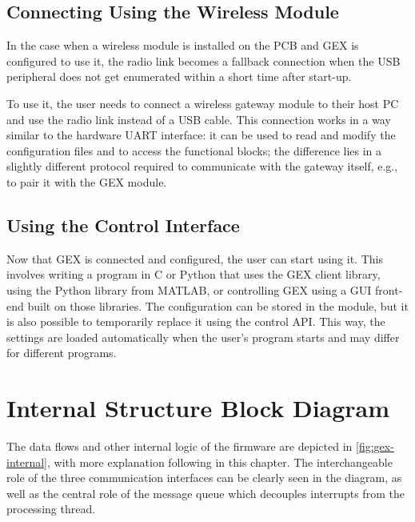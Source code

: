 \subsection{Connecting Using the Wireless Module}

In the case when a wireless module is installed on the \gls{PCB} and GEX is configured to use it, the radio link becomes a fallback connection when the \gls{USB} peripheral does not get enumerated within a short time after start-up.

To use it, the user needs to connect a wireless gateway module to their host \gls{PC} and use the radio link instead of a \gls{USB} cable. This connection works in a way similar to the hardware UART interface: it can be used to read and modify the configuration files and to access the functional blocks; the difference lies in a slightly different protocol required to communicate with the gateway itself, e.g., to pair it with the GEX module.

\subsection{Using the Control Interface}

Now that GEX is connected and configured, the user can start using it. This involves writing a program in C or Python that uses the GEX client library, using the Python library from MATLAB, or controlling GEX using a \gls{GUI} front-end built on those libraries. The configuration can be stored in the module, but it is also possible to temporarily replace it using the control \gls{API}. This way, the settings are loaded automatically when the user's program starts and may differ for different programs.

\section{Internal Structure Block Diagram}

The data flows and other internal logic of the firmware are depicted in \cref{fig:gex-internal}, with more explanation following in this chapter. The interchangeable role of the three communication interfaces can be clearly seen in the diagram, as well as the central role of the message queue which decouples interrupts from the processing thread.

